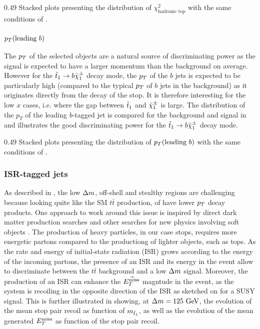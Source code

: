                  {0.49}
                 {Stacked plots presenting the distribution of $\chi^2_\text{hadronic top}$
                 with the same conditions of .}

    \subsubsection{$p_T(\text{leading } b)$}

    The $p_T$ of the selected objects are a natural source of discriminating power as
    the signal is expected to have a larger momentum than the background on average.
    However for the $\tilde{t}_1 \rightarrow b \tilde{\chi}_1^\pm$ decay mode, the $p_T$ of the
    $b$ jets is expected to be particularly high (compared to the typical $p_T$ of $b$ jets in the
    background) as it originates directly from the decay of the stop. It is therefore
    interesting for the low $x$ cases, i.e. where the gap between $\tilde{t}_1$ and
    $\tilde{\chi}_1^\pm$ is large. The distribution of the $p_T$ of the leading
    $b$-tagged jet is compared for the background and signal in 
    and illustrates the good discriminating power for the $\tilde{t}_1 \rightarrow b \tilde{\chi}_1^\pm$
    decay mode.

                 {0.49}
                 {Stacked plots presenting the distribution of $p_T(\text{leading } b)$
                 with the same conditions of .}

    \subsubsection{ISR-tagged jets \label{sec:ISRjets}}

    As described in , the low $\Delta m$,
    off-shell and stealthy regions are challenging because looking quite like the SM
    $t\bar{t}$ production, of have lower $p_T$ decay products. One approach to
    work around this issue is inspired by direct dark matter production searches \cite{EXOmonojet}
    and other searches for new physics involving soft objects \cite{SUScompressedStop}. The
    production of heavy particles, in our case stops, requires more energetic
    partons compared to the productiong of lighter objects, such as tops. As the rate and energy of
    initial-state radiation (ISR) grows according to the energy of the incoming partons,
    the presence of an ISR and its energy in the event allow to discriminate between the $t\bar{t}$
    background and a low $\Delta m$ signal. Moreover, the production of an ISR can enhance
    the $\vec{E_T^\text{miss}}$ magntude in the event, as the system is recoiling in the opposite
    direction of the ISR as sketched on  for a
    SUSY signal. This is further illustrated in  showing, at
    $\Delta m = 125~\text{GeV}$, the evolution of the mean stop pair recoil as function
    of $m_{\tilde{t}_1}$, as well as the evolution of the mean generated $E_T^\text{miss}$ as function
    of the stop pair recoil.

